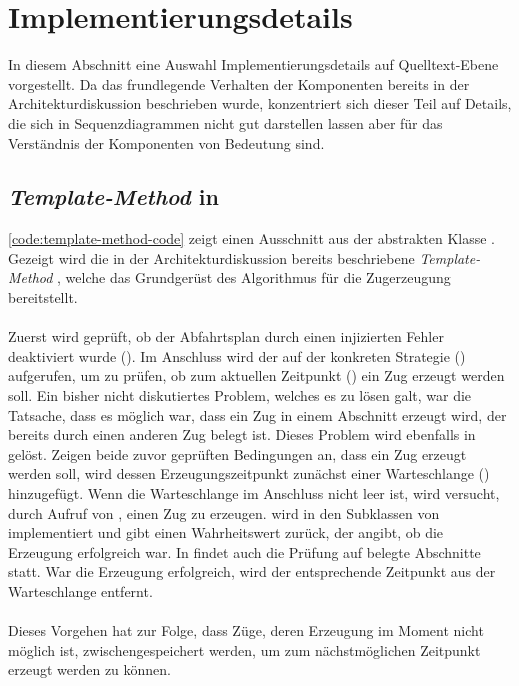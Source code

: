 \section{Implementierungsdetails}

In diesem Abschnitt eine Auswahl Implementierungsdetails auf Quelltext-Ebene vorgestellt. Da das frundlegende Verhalten der Komponenten bereits in der Architekturdiskussion beschrieben wurde, konzentriert sich dieser Teil auf Details, die sich in Sequenzdiagrammen nicht gut darstellen lassen aber für das Verständnis der Komponenten von Bedeutung sind.

\subsection{\emph{Template-Method} in }

\autoref{code:template-method-code} zeigt einen Ausschnitt aus der abstrakten Klasse . Gezeigt wird die in der Architekturdiskussion bereits beschriebene \emph{Template-Method} , welche das Grundgerüst des Algorithmus für die Zugerzeugung bereitstellt.\\
\\
Zuerst wird geprüft, ob der Abfahrtsplan durch einen injizierten Fehler deaktiviert wurde (). Im Anschluss wird der  auf der konkreten Strategie () aufgerufen, um zu prüfen, ob zum aktuellen Zeitpunkt () ein Zug erzeugt werden soll. Ein bisher nicht diskutiertes Problem, welches es zu lösen galt, war die Tatsache, dass es möglich war, dass ein Zug in einem Abschnitt erzeugt wird, der bereits durch einen anderen Zug belegt ist. Dieses Problem wird ebenfalls in  gelöst. Zeigen beide zuvor geprüften Bedingungen an, dass ein Zug erzeugt werden soll, wird dessen Erzeugungszeitpunkt zunächst einer Warteschlange () hinzugefügt. Wenn die Warteschlange im Anschluss nicht leer ist, wird versucht, durch Aufruf von , einen Zug zu erzeugen.  wird in den Subklassen von  implementiert und gibt einen Wahrheitswert zurück, der angibt, ob die Erzeugung erfolgreich war. In  findet auch die Prüfung auf belegte Abschnitte statt. War die Erzeugung erfolgreich, wird der entsprechende Zeitpunkt aus der Warteschlange entfernt.\\
\\
Dieses Vorgehen hat zur Folge, dass Züge, deren Erzeugung im Moment nicht möglich ist, zwischengespeichert werden, um zum nächstmöglichen Zeitpunkt erzeugt werden zu können.

